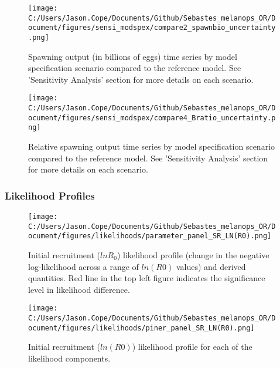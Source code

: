 \documentclass[11pt,
  letterpaper,
]{article}
\begin{document}
\newpage

\begin{figure}
{\centering
\texttt{[image: C:/Users/Jason.Cope/Documents/Github/Sebastes\_melanops\_OR/Document/figures/sensi\_modspex/compare2\_spawnbio\_uncertainty.png]}
}
\caption{Spawning output (in billions of eggs) time series by model specification scenario compared to the reference model. See 'Sensitivity Analysis' section for more details on each scenario.\label{fig:sensi-modspec-ssb}}
\end{figure}

\newpage

\begin{figure}
{\centering
\texttt{[image: C:/Users/Jason.Cope/Documents/Github/Sebastes\_melanops\_OR/Document/figures/sensi\_modspex/compare4\_Bratio\_uncertainty.png]}
}
\caption{Relative spawning output time series by model specification scenario compared to the reference model. See 'Sensitivity Analysis' section for more details on each scenario.\label{fig:sensi-modspec-depl}}
\end{figure}

\newpage

\hypertarget{likelihood-profiles-2}{%
\subsubsection{Likelihood Profiles}\label{likelihood-profiles-2}}

\begin{figure}
{\centering
\texttt{[image: C:/Users/Jason.Cope/Documents/Github/Sebastes\_melanops\_OR/Document/figures/likelihoods/parameter\_panel\_SR\_LN(R0).png]}
}
\caption{Initial recruitment ($lnR_0$) likelihood profile (change in the negative log-likelihood across a range of $ln(R0)$ values) and derived quantities. Red line in the top left figure indicates the significance level in likelihood difference.\label{fig:R0-profile}}
\end{figure}

\pagebreak

\begin{figure}
{\centering
\texttt{[image: C:/Users/Jason.Cope/Documents/Github/Sebastes\_melanops\_OR/Document/figures/likelihoods/piner\_panel\_SR\_LN(R0).png]}
}
\caption{Initial recruitment ($ln(R0)$) likelihood profile for each of the likelihood components.\label{fig:R0-profile-components}}
\end{figure}
\end{document}
